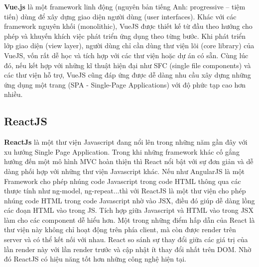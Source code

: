 \textbf{Vue.js} là một framework linh động (nguyên bản tiếng Anh: progressive – tiệm tiến) dùng để xây dựng giao diện người dùng (user interfaces). Khác với các framework nguyên khối (monolithic), VueJS được thiết kế từ đầu theo hướng cho phép và khuyến khích việc phát triển ứng dụng theo từng bước. Khi phát triển lớp giao diện (view layer), người dùng chỉ cần dùng thư viện lõi (core library) của VueJS, vốn rất dễ học và tích hợp với các thư viện hoặc dự án có sẵn. Cùng lúc đó, nếu kết hợp với những kĩ thuật hiện đại như SFC (single file components) và các thư viện hỗ trợ, VueJS cũng đáp ứng được dễ dàng nhu cầu xây dựng những ứng dụng một trang (SPA - Single-Page Applications) với độ phức tạp cao hơn nhiều.

\subsection{ReactJS}

\textbf{ReactJs} là một thư viện Javascript đang nổi lên trong những năm gần đây với xu hướng Single Page Application. Trong khi những framework khác cố gắng hướng đến một mô hình MVC hoàn thiện thì React nổi bật với sự đơn giản và dễ dàng phối hợp với những thư viện Javascript khác. Nếu như AngularJS là một Framework cho phép nhúng code Javascript trong code HTML thông qua các thược tính như ng-model, ng-repeat...thì với ReactJS là một thư viện cho phép nhúng code HTML trong code Javascript nhờ vào JSX, điều đó giúp dễ dàng lồng các đoạn HTML vào trong JS. Tích hợp giữa Javascript và HTML vào trong JSX làm cho các component dễ hiểu hơn. Một trong những điểm hấp dẫn của React là thư viện này không chỉ hoạt động trên phía client, mà còn được render trên server và có thể kết nối với nhau. React so sánh sự thay đổi giữa các giá trị của lần render này với lần render trước và cập nhật ít thay đổi nhất trên DOM. Nhờ đó ReactJS có hiệu năng tốt hơn những công nghệ hiện tại.

